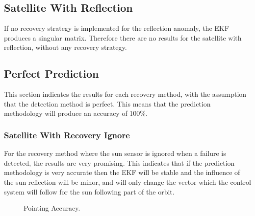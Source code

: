 \documentclass[letterpaper, 10 pt, conference]{ieeeconf}  %
\begin{document}
\newpage

\subsection{Satellite With Reflection}
If no recovery strategy is implemented for the reflection anomaly, the EKF produces a singular matrix. Therefore there are no results for the satellite with reflection, without any recovery strategy.
\newpage

\subsection{Perfect Prediction}
This section indicates the results for each recovery method, with the assumption that the detection method is perfect. This means that the prediction methodology will produce an accuracy of 100\%.

\subsubsection{Satellite With Recovery Ignore}
For the recovery method where the sun sensor is ignored when a failure is detected, the results are very promising. This indicates that if the prediction methodology is very accurate then the EKF will be stable and the influence of the sun reflection will be minor, and will only change the vector which the control system will follow for the sun following part of the orbit.

\begin{figure}[!htb]
	\centering
	\caption[Pointing Accuracy]{Pointing Accuracy.}
	\label{fig:Pointing Accuracy EKF-reset}
\end{figure}
\end{document}
